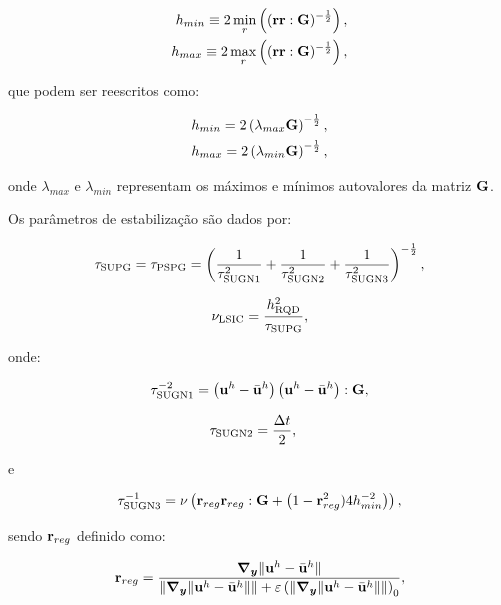 \documentclass[tese_patricia]{subfiles}%
\begin{document}
\begin{align}
	h_{min} \equiv 2\min_{r}\left((\mathbf{r}\mathbf{r}:\mathbf{G})^{-\frac{1}{2}} \right), \\
	h_{max} \equiv 2\max_{r}\left((\mathbf{r}\mathbf{r}:\mathbf{G})^{-\frac{1}{2}} \right),
\end{align}

\noindent que podem ser reescritos como:

\begin{align}
	h_{min} = 2\left(\lambda_{max}\mathbf{G}\right)^{-\frac{1}{2}}, \\
	h_{max} = 2\left(\lambda_{min}\mathbf{G}\right)^{-\frac{1}{2}},
\end{align}

\noindent onde $\lambda_{max}$ e $\lambda_{min}$ representam os máximos e mínimos autovalores da matriz $\mathbf{G}$. 

Os parâmetros de estabilização são dados por:

\begin{align}
	\tau_{\mathrm{SUPG}} = \tau_{\mathrm{PSPG}} =\left(\frac{1}{\tau_{\mathrm{SUGN1}}^2} + \frac{1}{\tau_{\mathrm{SUGN2}}^2} + \frac{1}{\tau_{\mathrm{SUGN3}}^2} \right)^{-\frac{1}{2}},
\end{align}

\begin{align}
	\nu_{\mathrm{LSIC}} = \frac{h_{\mathrm{RQD}}^2}{\tau_{\mathrm{SUPG}}},
\end{align}

\noindent onde:

\begin{align}
	\tau_{\mathrm{SUGN1}}^{-2} = \left(\mathbf{u}^h - \bar{\mathbf{u}}^h \right) \left(\mathbf{u}^h - \bar{\mathbf{u}}^h \right) : \mathbf{G} ,
\end{align}

\begin{align}
	\tau_{\mathrm{SUGN2}}&=\frac{\Delta t}{2},
\end{align}

\noindent e

\begin{align}
	\tau_{\mathrm{SUGN3}}^{-1} = \nu \left(\mathbf{r}_{reg}\mathbf{r}_{reg} : \mathbf{G} + \left(1 - \mathbf{r}_{reg}^2)4h_{min}^{-2} \right)\right) ,
\end{align}

\noindent sendo $\mathbf{r}_{reg}$ definido como:

\begin{align}
	\mathbf{r}_{reg} =\frac{\boldsymbol{\nabla_y} \lVert\mathbf{u}^h - \bar{\mathbf{u}}^h\rVert}{\lVert \boldsymbol{\nabla_y} \lVert\mathbf{u}^h - \bar{\mathbf{u}}^h\rVert\rVert + \varepsilon\left(\lVert \boldsymbol{\nabla_y} \lVert\mathbf{u}^h - \bar{\mathbf{u}}^h\rVert\rVert\right)_0},
\end{align}
\end{document}
